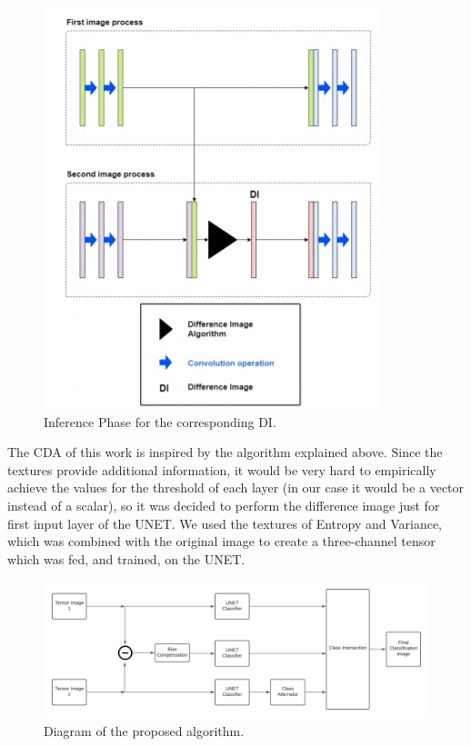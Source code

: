 \begin{figure}[ht]
    \centering
    \includegraphics{Chapter7/kevin_algorithm.jpg}
    \caption{Inference Phase for the corresponding DI.}
    \label{fig:kevin_algorithm}
\end{figure}

The CDA of this work is inspired by the algorithm explained above. Since the textures provide additional information, it would be very 
hard to empirically achieve the values for the threshold of each layer (in our case it would be a vector instead of a scalar), so it was decided to perform the difference image
just for first input layer of the UNET.
We used the textures of Entropy and Variance, which was combined with the original image to create a three-channel tensor which was fed, and trained, on the UNET.

\begin{figure}[ht]
    \centering
    \includegraphics[width=\linewidth]{Chapter7/diagrama.png}
    \caption{ Diagram of the proposed algorithm.}
    \label{fig:diagrama}
\end{figure}

